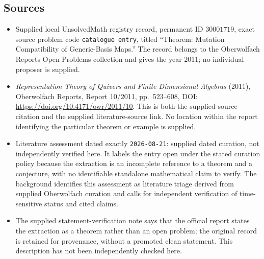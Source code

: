 \documentclass[11pt]{article}
\begin{document}
\subsection{Sources}
\begin{itemize}
\item Supplied local UnsolvedMath registry record, permanent ID \(30001719\), exact source problem code \texttt{catalogue entry}, titled ``Theorem: Mutation Compatibility of Generic-Basis Maps.'' The record belongs to the Oberwolfach Reports Open Problems collection and gives the year 2011; no individual proposer is supplied.
\item \emph{Representation Theory of Quivers and Finite Dimensional Algebras} (2011), Oberwolfach Reports, Report 10/2011, pp.\ 523--608, DOI: \url{https://doi.org/10.4171/owr/2011/10}. This is both the supplied source citation and the supplied literature-source link. No location within the report identifying the particular theorem or example is supplied.
\item Literature assessment dated exactly \texttt{2026-08-21}: supplied dated curation, not independently verified here. It labels the entry open under the stated curation policy because the extraction is an incomplete reference to a theorem and a conjecture, with no identifiable standalone mathematical claim to verify. The background identifies this assessment as literature triage derived from supplied Oberwolfach curation and calls for independent verification of time-sensitive status and cited claims.
\item The supplied statement-verification note says that the official report states the extraction as a theorem rather than an open problem; the original record is retained for provenance, without a promoted clean statement. This description has not been independently checked here.
\end{itemize}
\end{document}
